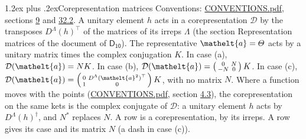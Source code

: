 \documentclass[10pt,a4paper]{article}
\makeatletter
\renewcommand\section{\@startsection{section}{1}{\z@}{-3ex plus -1ex minus -.2ex}%
  {1.2ex plus .2ex}{\normalfont\large\sffamily\bfseries\color{parttitle}}}
\numberwithin{equation}{section}
\newcommand{\eltfont}[1]{{\let\sigma\eltsigma\mathelt{#1}}}
\newcommand{\grp}[1]{\mathsf{#1}}
\newcommand{\elt}[1]{\eltfont{#1}}
\makeatother
\begin{document}
\section{Corepresentation matrices}\label{s:corep_matrices}
Conventions: \href{../../CONVENTIONS.pdf}{CONVENTIONS.pdf}, sections \href{../../../rotation/CONVENTIONS.pdf\#conv.9}{9} and \href{../../CONVENTIONS.pdf\#conv.32.2}{32.2}.
A unitary element $h$ acts in a corepresentation $\mathcal{D}$ by the transposes $D^{\Lambda}(h)^{\top}$ of the matrices of its irreps $\Lambda$ (the section Representation matrices of the document of \href{../../../rotation/data/pdf/D10.pdf}{$\grp{D_{10}}$}). The representative $\elt{a} = \varTheta$ acts by a unitary matrix times the complex conjugation $K$.
In case (a), $\mathcal{D}(\elt{a}) = NK$. In case (b), $\mathcal{D}(\elt{a}) = \left(\begin{smallmatrix} 0 & N \\ -N & 0 \end{smallmatrix}\right) K$. In case (c), $\mathcal{D}(\elt{a}) = \left(\begin{smallmatrix} 0 & D^{\Lambda}(\elt{a}^2)^{\top} \\ 1 & 0 \end{smallmatrix}\right) K$, with no matrix $N$.
Where a function moves with the points (\href{../../CONVENTIONS.pdf}{CONVENTIONS.pdf}, section \href{../../../rotation/CONVENTIONS.pdf\#conv.4.3}{4.3}), the corepresentation on the same kets is the complex conjugate of $\mathcal{D}$: a unitary element $h$ acts by $D^{\Lambda}(h)^{\dagger}$, and $N^{*}$ replaces $N$.
A row is a corepresentation, by its irreps. A row gives its case and its matrix $N$ (a dash in case (c)).
\end{document}
